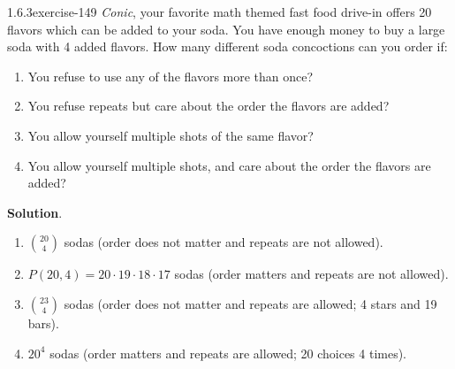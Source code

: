 \documentclass[twoside,11pt,]{book}
\numberwithin{equation}{chapter}
\begin{document}
\begin{divisionsolution}{1.6.3}{}{exercise-149}%
\hypertarget{p-2503}{}%
\emph{Conic}, your favorite math themed fast food drive-in offers 20 flavors which can be added to your soda. You have enough money to buy a large soda with 4 added flavors. How many different soda concoctions can you order if:\leavevmode%
\begin{enumerate}[label=(\alph*)]
\item\hypertarget{li-1500}{}\hypertarget{p-2504}{}%
You refuse to use any of the flavors more than once?%
\item\hypertarget{li-1501}{}\hypertarget{p-2506}{}%
You refuse repeats but care about the order the flavors are added?%
\item\hypertarget{li-1502}{}\hypertarget{p-2508}{}%
You allow yourself multiple shots of the same flavor?%
\item\hypertarget{li-1503}{}\hypertarget{p-2510}{}%
You allow yourself multiple shots, and care about the order the flavors are added?%
\end{enumerate}
%
\par\smallskip%
\noindent\textbf{Solution}.\quad%
\hypertarget{p-2512}{}%
\leavevmode%
\begin{enumerate}[label=(\alph*)]
\item\hypertarget{li-1504}{}\hypertarget{p-2513}{}%
\({20 \choose 4}\) sodas (order does not matter and repeats are not allowed).%
\item\hypertarget{li-1505}{}\hypertarget{p-2514}{}%
\(P(20, 4) = 20\cdot 19\cdot 18 \cdot 17\) sodas (order matters and repeats are not allowed).%
\item\hypertarget{li-1506}{}\hypertarget{p-2515}{}%
\({23 \choose 4}\) sodas (order does not matter and repeats are allowed; 4 stars and 19 bars).%
\item\hypertarget{li-1507}{}\hypertarget{p-2516}{}%
\(20^4\) sodas (order matters and repeats are allowed; 20 choices 4 times).%
\end{enumerate}
%
\end{divisionsolution}%
\end{document}
